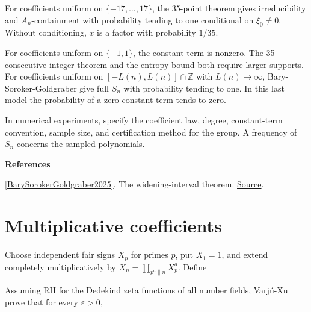 \documentclass[11pt,a4paper,oneside,openany]{book}
\newcommand{\atlasdisplay}[1]{\par\begingroup\centering\vspace{3pt}\noindent\adjustbox{max width=\linewidth}{\(\displaystyle #1\)}\par\vspace{5pt}\endgroup}
\newenvironment{sources}{\par\smallskip\begingroup\footnotesize\color{atlasgray}\leftskip=10pt\setlength{\parskip}{2pt}}{\par\endgroup\smallskip}
\begin{document}
\begin{atlasblock}[standard]
\color{black} For coefficients uniform on \(\{-17,\ldots,17\}\), the 35-point theorem gives irreducibility and \(A_n\)-containment with probability tending to one conditional on \(\xi_0\ne0\). Without conditioning, \(x\) is a factor with probability \(1/35\).\par
\color{black} For coefficients uniform on \(\{-1,1\}\), the constant term is nonzero. The 35-consecutive-integer theorem and the entropy bound both require larger supports. For coefficients uniform on \([-L(n),L(n)]\cap\mathbb Z\) with \(L(n)\to\infty\), Bary-Soroker-Goldgraber give full \(S_n\) with probability tending to one. In this last model the probability of a zero constant term tends to zero.\par
\end{atlasblock}\color{black}
\color{black} In numerical experiments, specify the coefficient law, degree, constant-term convention, sample size, and certification method for the group. A frequency of \(S_n\) concerns the sampled polynomials.\par
\begin{sources}
\textbf{References}\par\smallskip
\noindent\hyperlink{ref:BarySorokerGoldgraber2025}{[BarySorokerGoldgraber2025]}. The widening-interval theorem. \href{https://arxiv.org/abs/2404.13559}{Source}.\par
\end{sources}\color{black}
\section{Multiplicative coefficients}
\color{black} Choose independent fair signs \(X_p\) for primes \(p\), put \(X_1=1\), and extend completely multiplicatively by \(X_n=\prod_{p^a\parallel n}X_p^a\). Define\par

\atlasdisplay{P_d(x)=\sum_{j=1}^dX_jx^j.}
\color{black} Assuming RH for the Dedekind zeta functions of all number fields, Varjú-Xu prove that for every \(\varepsilon>0\),\par
\end{document}
